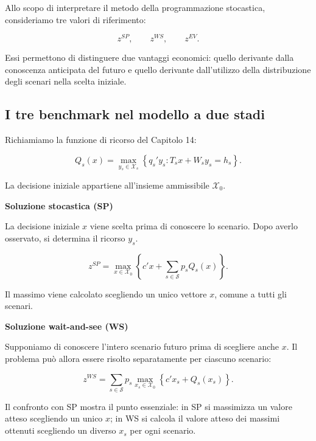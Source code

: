 Allo scopo di interpretare il metodo della programmazione stocastica, consideriamo tre valori di riferimento:

\[
z^{SP},\qquad z^{WS},\qquad z^{EV}.
\]

Essi permettono di distinguere due vantaggi economici:
quello derivante dalla conoscenza anticipata del futuro
e quello derivante dall'utilizzo della distribuzione
degli scenari nella scelta iniziale.


\subsection{I tre benchmark nel modello a due stadi}

Richiamiamo la funzione di ricorso del Capitolo 14:

\[
Q_s(x)
=
\max_{y_s\in\mathcal X_s}
\left\{
q_s'y_s:
T_sx+W_sy_s=h_s
\right\}.
\]

La decisione iniziale appartiene all'insieme
ammissibile $\mathcal X_0$.

\medskip

\noindent
\textbf{Soluzione stocastica (SP)}

La decisione iniziale $x$ viene scelta prima
di conoscere lo scenario. Dopo averlo osservato,
si determina il ricorso $y_s$.

\begin{equation}
z^{SP}
=
\max_{x\in\mathcal X_0}
\left\{
c'x+
\sum_{s\in\mathcal S}p_sQ_s(x)
\right\}.
\label{eq:cap15-sp-benchmark-v2}
\end{equation}

Il massimo viene calcolato scegliendo un unico
vettore $x$, comune a tutti gli scenari.

\medskip

\noindent
\textbf{Soluzione wait-and-see (WS)}

Supponiamo di conoscere l'intero scenario
futuro prima di scegliere anche $x$.
Il problema pu\`o allora essere risolto
separatamente per ciascuno scenario:

\begin{equation}
z^{WS}
=
\sum_{s\in\mathcal S}p_s
\max_{x_s\in\mathcal X_0}
\left\{
c'x_s+Q_s(x_s)
\right\}.
\label{eq:cap15-ws-benchmark-v2}
\end{equation}

Il confronto con SP mostra il punto essenziale:
in SP si massimizza un valore atteso scegliendo
un unico $x$; in WS si calcola il valore atteso
dei massimi ottenuti scegliendo un diverso $x_s$
per ogni scenario.

